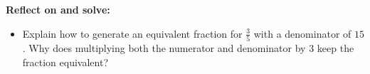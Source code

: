 \documentclass[12pt]{article}
\begin{document}
\begin{tcolorbox}[colframe=black!60, colback=white, 
coltitle=black, colbacktitle=black!15, fonttitle=\bfseries\Large, 
title=Exit Ticket, halign title=center, left=10pt, right=10pt, top=10pt, bottom=80pt]
\textbf{Reflect on and solve:}
\begin{itemize}
    \item Explain how to generate an equivalent fraction for \( \frac{3}{5} \) with a denominator of \( 15 \). Why does multiplying both the numerator and denominator by \( 3 \) keep the fraction equivalent?
\end{itemize}
\vspace{1cm}
\end{tcolorbox}
\end{document}
